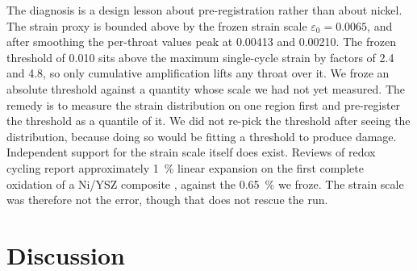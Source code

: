 \documentclass[5p,times,twocolumn]{elsarticle}
\begin{document}
The diagnosis is a design lesson about pre-registration rather than about
nickel. The strain proxy is bounded above by the frozen strain scale
$\varepsilon_0 = 0.0065$, and after smoothing the per-throat values peak at
0.00413 and 0.00210. The frozen threshold of 0.010 sits above the maximum
single-cycle strain by factors of 2.4 and 4.8, so only cumulative
amplification lifts any throat over it. We froze an absolute threshold against
a quantity whose scale we had not yet measured. The remedy is to measure the
strain distribution on one region first and pre-register the threshold as a
quantile of it. We did not re-pick the threshold after seeing the
distribution, because doing so would be fitting a threshold to produce damage.
Independent support for the strain scale itself does exist. Reviews of redox
cycling report approximately \SI{1}{\percent} linear expansion on the first
complete oxidation of a Ni/YSZ composite \cite{sarantaridis2007}, against the
\SI{0.65}{\percent} we froze. The strain scale was therefore not the error,
though that does not rescue the run.

\section{Discussion}
\end{document}
